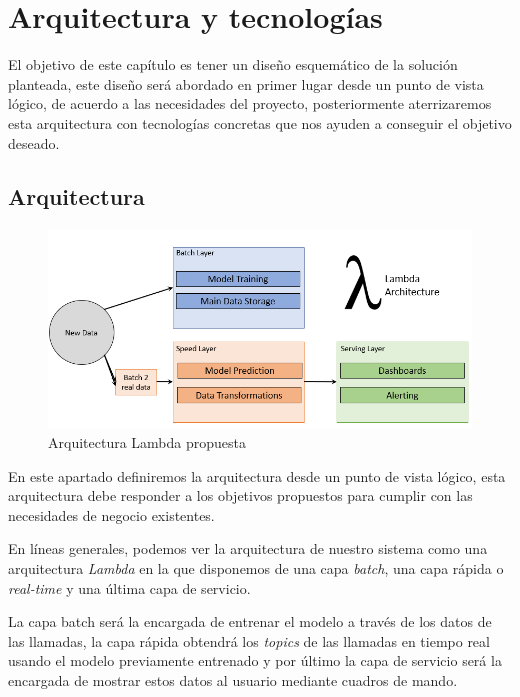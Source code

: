 \chapter{Arquitectura y tecnologías}
\label{chapter:arquitectura}

El objetivo de este capítulo es tener un diseño esquemático de la solución planteada, este diseño será abordado en primer lugar desde un punto de vista lógico, de acuerdo a las necesidades del proyecto, posteriormente aterrizaremos esta arquitectura con tecnologías concretas que nos ayuden a conseguir el objetivo deseado.

\section{Arquitectura}
\begin{figure}[!ht]
	\centering
	\includegraphics[width=1\textwidth]{images/arqu/lambda}
	\caption{Arquitectura Lambda propuesta}
	\label{fig:lambda}
\end{figure}




En este apartado definiremos la arquitectura desde un punto de vista lógico, esta arquitectura debe responder a los objetivos propuestos para cumplir con las necesidades de negocio existentes. 


En líneas generales, podemos ver la arquitectura de nuestro sistema como una arquitectura \textit{Lambda} en la que disponemos de una capa \textit{batch}, una capa rápida o \textit{real-time} y una última capa de servicio.



La capa batch será la encargada de entrenar el modelo a través de los datos de las llamadas, la capa rápida obtendrá los \textit{topics} de las llamadas en tiempo real usando el modelo previamente entrenado y por último la capa de servicio será la encargada de mostrar estos datos al usuario mediante cuadros de mando.  

